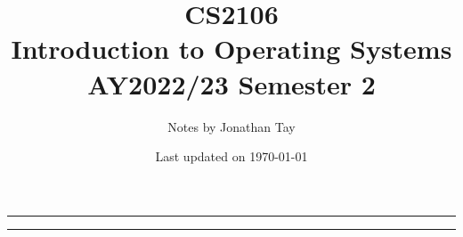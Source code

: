 \documentclass{article}
\title{\vspace{-1cm}\textbf{CS2106 \\[0.25em] Introduction to Operating Systems} \\[2em] \Large AY2022/23 Semester 2 \\[1em]}
\author{Notes by Jonathan Tay}
\date{Last updated on \today}
\newcommand{\pageline}[1]{\par\noindent\rule{\textwidth}{#1}} %
\begin{document}
\linespread{1.4}\selectfont
{} %
\maketitle
\pageline{1.5pt}
\tableofcontents
\pageline{1.5pt}
\linespread{1.1}\selectfont

\newpage
{} %
\begin{multicols*}{2}
    
\end{multicols*}
\end{document}
